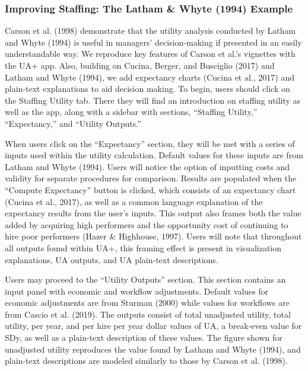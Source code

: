 \documentclass[
  english,
  man]{apa6}
\begin{document}
\subsubsection{Improving Staffing: The Latham \& Whyte (1994) Example}\label{improving-staffing-the-latham-whyte-1994-example}

Carson et al. (1998) demonstrate that the utility analysis conducted by Latham and Whyte (1994) is useful in managers' decision-making if presented in an easily understandable way. We reproduce key features of Carson et al.'s vignettes with the UA+ app. Also, building on Cucina, Berger, and Busciglio (2017) and Latham and Whyte (1994), we add expectancy charts (Cucina et al., 2017) and plain-text explanations to aid decision making. To begin, users should click on the Staffing Utility tab. There they will find an introduction on staffing utility as well as the app, along with a sidebar with sections, ``Staffing Utility,'' ``Expectancy,'' and ``Utility Outputs.''

When users click on the ``Expectancy'' section, they will be met with a series of inputs used within the utility calculation. Default values for these inputs are from Latham and Whyte (1994). Users will notice the option of inputting costs and validity for separate procedures for comparison. Results are populated when the ``Compute Expectancy'' button is clicked, which consists of an expectancy chart (Cucina et al., 2017), as well as a common language explanation of the expectancy results from the user's inputs. This output also frames both the value added by acquiring high performers and the opportunity cost of continuing to hire poor performers (Hazer \& Highhouse, 1997). Users will note that throughout all outputs found within UA+, this framing effect is present in visualization explanations, UA outputs, and UA plain-text descriptions.

Users may proceed to the ``Utility Outputs'' section. This section contains an input panel with economic and workflow adjustments. Default values for economic adjustments are from Sturman (2000) while values for workflows are from Cascio et al. (2019). The outputs consist of total unadjusted utility, total utility, per year, and per hire per year dollar values of UA, a break-even value for SDy, as well as a plain-text description of these values. The figure shown for unadjusted utility reproduces the value found by Latham and Whyte (1994), and plain-text descriptions are modeled similarly to those by Carson et al. (1998).
\end{document}
